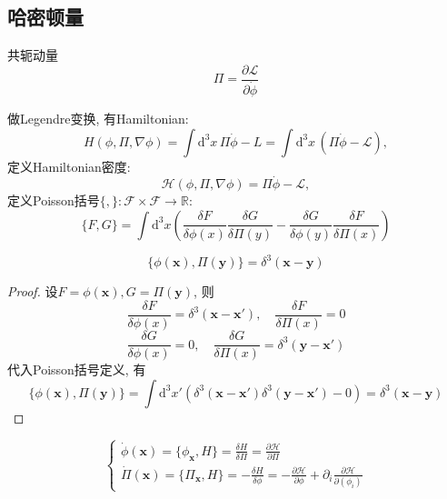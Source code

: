 \subsection{哈密顿量}
\begin{definition}[共轭动量]
    共轭动量
    \begin{equation}
        \Pi = \frac{\partial\mathcal L}{\partial\dot\phi}
    \end{equation}
\end{definition}
做Legendre变换, 有Hamiltonian:
\begin{equation}
    H(\phi, \Pi, \nabla\phi) = \int \mathrm d^3x \, \Pi\dot\phi-L=\int \mathrm d^3x \, (\Pi\dot\phi-\mathcal L),
\end{equation}
定义Hamiltonian密度:
\begin{equation}
    \mathcal H(\phi, \Pi, \nabla\phi) = \Pi\dot\phi - \mathcal L,
\end{equation}
定义Poisson括号$\{, \}: \mathcal F\times\mathcal F\to\mathbb{R}$:
\begin{equation}
    \{F, G\}=\displaystyle\int \mathrm d^3x \left(\frac{\delta F}{\delta\phi(x)}\frac{\delta G}{\delta\Pi(y)}-\frac{\delta G}{\delta\phi(y)}\frac{\delta F}{\delta\Pi(x)}\right)
\end{equation}
\begin{example}
    \begin{equation}
        \{\phi(\mathbf x), \Pi(\mathbf y)\} = \delta^3(\mathbf x - \mathbf y)
    \end{equation}
\end{example}
\begin{proof}
    设$F=\phi(\mathbf x), G=\Pi(\mathbf y)$, 则
    \begin{equation}
        \frac{\delta F}{\delta\phi(x)} = \delta^3(\mathbf x - \mathbf x'), \quad \frac{\delta F}{\delta\Pi(x)} = 0
    \end{equation}
    \begin{equation}
        \frac{\delta G}{\delta\phi(x)} = 0, \quad \frac{\delta G}{\delta\Pi(x)} = \delta^3(\mathbf y - \mathbf x')
    \end{equation}
    代入Poisson括号定义, 有
    \begin{equation}
        \{\phi(\mathbf x), \Pi(\mathbf y)\} = \int \mathrm d^3x' (\delta^3(\mathbf x - \mathbf x')\delta^3(\mathbf y - \mathbf x') - 0) = \delta^3(\mathbf x - \mathbf y)
    \end{equation}
\end{proof}
\theorem[哈密顿正则方程]
\begin{equation}
    \begin{cases}
        \dot\phi(\mathbf x) = \{\phi_{\mathbf x}, H\}=\frac{\delta H}{\delta\Pi}=\frac{\partial\mathcal H}{\partial\Pi}\\
        \dot\Pi(\mathbf x) = \{\Pi_{\mathbf x}, H\}=-\frac{\delta H}{\delta\phi}=-\frac{\partial\mathcal H}{\partial\phi}+\partial_i\frac{\partial\mathcal H}{\partial(\phi_i)}
    \end{cases}
\end{equation}
